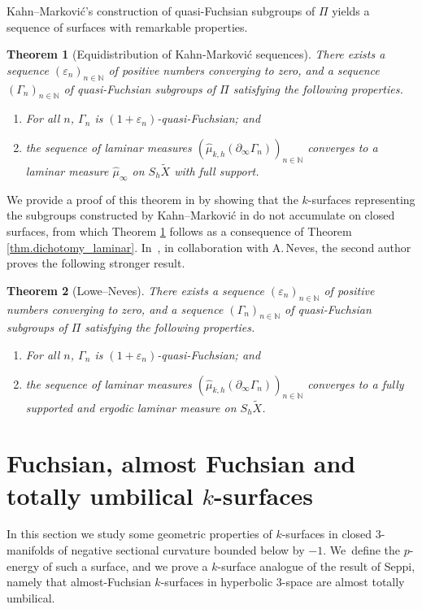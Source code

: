 \documentclass[JEP,XML,SOM,Unicode,NoEqCountersInSection,published]{cedram}
\newcommand{\ksurface}{$k$\nobreakdash-surface\xspace}
\newcommand{\ksurfaces}{$k$\nobreakdash-surfaces\xspace}
\theoremstyle{plain}
\newtheorem{theorem}{Theorem}[section]
\theoremstyle{definition}
\let\eps\varepsilon
\newcommand{\bord}{\partial_{\infty}}
\begin{document}
Kahn--Markovi\'c's construction \cite{KM1} of quasi-Fuchsian subgroups of $\Pi$ yields a sequence of surfaces with remarkable properties.

\begin{theorem}[Equidistribution of Kahn-Markovi\'c sequences]\label{KM_equidistrib}
There exists a sequence $(\eps_n)_{n\in\mathbb{N}}$ of positive numbers converging to zero, and a sequence $(\Gamma_n)_{n\in\mathbb{N}}$ of quasi-Fuchsian subgroups of $\Pi$ satisfying the following properties.
\begin{enumerate}
\item For all $n$, $\Gamma_n$ is $(1+\eps_n)$-quasi-Fuchsian; and
\item the sequence of laminar measures $(\hat \mu_{k,h}(\bord\Gamma_n))_{n\in\mathbb{N}}$ converges to a laminar measure $\hat \mu_\infty$ on $S_h\tilde{X}$ with full support.
\end{enumerate}
\end{theorem}

We provide a proof of this theorem in \cite{ALS} by showing that the \ksurfaces representing the subgroups constructed by Kahn--Markovi\'c in \cite{KM1} do not accumulate on closed surfaces, from which Theorem \ref{KM_equidistrib} follows as a consequence of Theorem \ref{thm.dichotomy_laminar}. In~\cite[Prop.\,6.1]{ln21}, in collaboration with A.\,Neves, the second author proves the following stronger result.

\begin{theorem}[Lowe--Neves]\label{th.lowe_neves}
There exists a sequence $(\eps_n)_{n\in\mathbb{N}}$ of positive numbers converging to zero, and a sequence $(\Gamma_n)_{n\in\mathbb{N}}$ of quasi-Fuchsian subgroups of $\Pi$ satisfying the following properties.
\begin{enumerate}
\item For all $n$, $\Gamma_n$ is $(1+\eps_n)$-quasi-Fuchsian; and
\item the sequence of laminar measures $(\hat \mu_{k,h}(\bord\Gamma_n))_{n\in\mathbb{N}}$ converges to a fully supported and ergodic laminar measure on $S_h\tilde{X}$.
\end{enumerate}
\end{theorem}

\section{Fuchsian, almost Fuchsian and totally umbilical \texorpdfstring{\protect\ksurfaces}{ksurf}} In this section we study some geometric properties of \ksurfaces in closed $3$\nobreakdash-manifolds of negative sectional curvature bounded below by $-1$. We~define the $p$-energy of such a surface, and we prove a \ksurface analogue of the result \cite{Seppi} of Seppi, namely that almost-Fuchsian \ksurfaces in hyperbolic $3$\nobreakdash-space are almost totally umbilical.
\end{document}
